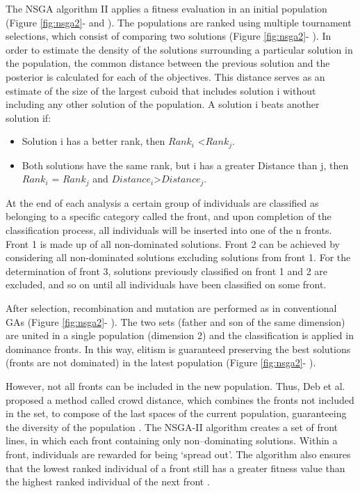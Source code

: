 \documentclass[espaco=umemeio,chapter=TITLE,twoside,openright]{abnt}
\begin{document}
The NSGA algorithm II applies a fitness evaluation in an initial population (Figure \ref{fig:nsga2}-  and ). The populations are ranked using multiple tournament selections, which consist of comparing two solutions (Figure \ref{fig:nsga2}- ). In order to estimate the density of the solutions surrounding a particular solution in the population, the common distance between the previous solution and the posterior is calculated for each of the objectives. This distance serves as an estimate of the size of the largest cuboid that includes solution i without including any other solution of the population. A solution i beats another solution if:

\begin{itemize}
\item Solution i has a better rank, then $Rank_i$ <$Rank_j$.
\item Both solutions have the same rank, but i has a greater Distance than j, then $Rank_i$ = $Rank_j$ and $Distance_i$>$Distance_j$.
\end{itemize}

At the end of each analysis a certain group of individuals are classified as belonging to a specific category called the front, and upon completion of the classification process, all individuals will be inserted into one of the n fronts. Front 1 is made up of all non-dominated solutions. Front 2 can be achieved by considering all non-dominated solutions excluding solutions from front 1. For the determination of front 3, solutions previously classified on front 1 and 2 are excluded, and so on until all individuals have been classified on some front.

After selection, recombination and mutation are performed as in conventional GAs (Figure \ref{fig:nsga2}- ). The two sets (father and son of the same dimension) are united in a single population (dimension 2) and the classification is applied in dominance fronts. In this way, elitism is guaranteed preserving the best solutions (fronts are not dominated) in the latest population (Figure \ref{fig:nsga2}- ).

However, not all fronts can be included in the new population. Thus, Deb et al. proposed a method called crowd distance, which combines the fronts not included in the set, to compose of the last spaces of the current population, guaranteeing the diversity of the population \cite{Deb2000}. The NSGA-II algorithm creates a set of front lines, in which each front containing only non–dominating solutions. Within a front, individuals are rewarded for being ‘spread out’. The algorithm also ensures that the lowest ranked individual of a front still has a greater fitness value than the highest ranked individual of the next front \cite{Yoo2007}.
\end{document}

